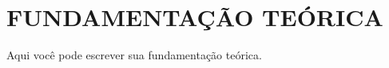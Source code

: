 \chapter{FUNDAMENTAÇÃO TEÓRICA}
\label{Fundamentacao}


Aqui você pode escrever sua fundamentação teórica.